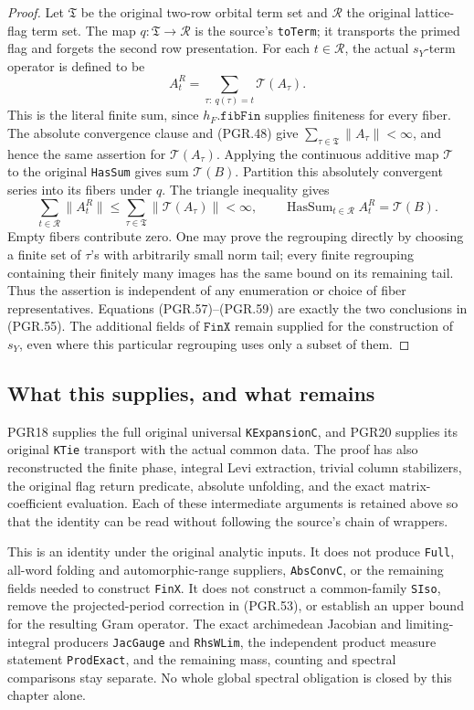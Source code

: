 \begin{proof}
Let \(\mathfrak T\) be the original two-row orbital term set
and \(\mathcal R\) the original lattice-flag term set.  The
map \(q:\mathfrak T\to\mathcal R\) is the source's
\texttt{toTerm}; it transports the primed flag and forgets the
second row presentation.  For each \(t\in\mathcal R\),
the actual \(s_Y\)-term operator is defined to be
\[
             A^R_t=\sum_{\tau:\ q(\tau)=t}\mathcal T(A_\tau).
\tag{PGR.58}
\]
This is the literal finite sum, since \(h_F.\texttt{fibFin}\)
supplies finiteness for every fiber.  The absolute convergence
clause and (PGR.48) give
\(\sum_{\tau\in\mathfrak T}\|A_\tau\|<\infty\),
and hence the same assertion for \(\mathcal T(A_\tau)\).
Applying the continuous additive map \(\mathcal T\) to the
original \texttt{HasSum} gives sum \(\mathcal T(B)\).
Partition this absolutely convergent series into its fibers under
\(q\).  The triangle inequality gives
\[
 \sum_{t\in\mathcal R}\|A^R_t\|
       \leq\sum_{\tau\in\mathfrak T}\|\mathcal T(A_\tau)\|<\infty,
 \qquad
       \operatorname{HasSum}_{t\in\mathcal R}A^R_t=\mathcal T(B).
\tag{PGR.59}
\]
Empty fibers contribute zero.  One may prove the regrouping directly
by choosing a finite set of \(\tau\)'s with arbitrarily small
norm tail; every finite regrouping containing their finitely many
images has the same bound on its remaining tail.  Thus the assertion
is independent of any enumeration or choice of fiber representatives.
Equations (PGR.57)--(PGR.59) are exactly the two conclusions in
(PGR.55).  The additional fields of \(\texttt{FinX}\) remain
supplied for the construction of \(s_Y\), even where this
particular regrouping uses only a subset of them.
\end{proof}

\subsection{What this supplies, and what remains}

PGR18 supplies the full original universal \texttt{KExpansionC},
and PGR20 supplies its original \texttt{KTie} transport with the
actual common data.  The proof has also reconstructed the finite
phase, integral Levi extraction, trivial column stabilizers, the
original flag return predicate, absolute unfolding, and the exact
matrix-coefficient evaluation.  Each of these intermediate arguments
is retained above so that the identity can be read without following
the source's chain of wrappers.

This is an identity under the original analytic inputs.  It does not
produce \texttt{Full}, all-word folding and automorphic-range
suppliers, \texttt{AbsConvC}, or the remaining fields needed to
construct \texttt{FinX}.  It does not construct a common-family
\texttt{SIso}, remove the projected-period correction in (PGR.53),
or establish an upper bound for the resulting Gram operator.
The exact archimedean Jacobian and limiting-integral producers
\texttt{JacGauge} and \texttt{RhsWLim}, the independent product
measure statement \texttt{ProdExact}, and the remaining mass,
counting and spectral comparisons stay separate.  No whole global
spectral obligation is closed by this chapter alone.
